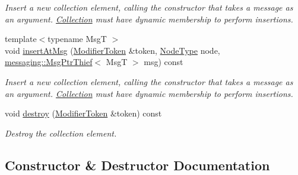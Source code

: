\begin{DoxyCompactItemize}
\begin{DoxyCompactList}\small\item\em Insert a new collection element, calling the constructor that takes a message as an argument. \hyperlink{structvt_1_1vrt_1_1collection_1_1_collection}{Collection} must have dynamic membership to perform insertions. \end{DoxyCompactList}\item 
{\footnotesize template$<$typename MsgT $>$ }\\void \hyperlink{structvt_1_1vrt_1_1collection_1_1_elm_insertable_ad07c3ba53ef279936ec6a2e4d06b3ea3}{insert\+At\+Msg} (\hyperlink{structvt_1_1vrt_1_1collection_1_1_modifier_token}{Modifier\+Token} \&token, \hyperlink{namespacevt_a866da9d0efc19c0a1ce79e9e492f47e2}{Node\+Type} node, \hyperlink{structvt_1_1messaging_1_1_msg_ptr_thief}{messaging\+::\+Msg\+Ptr\+Thief}$<$ MsgT $>$ msg) const
\begin{DoxyCompactList}\small\item\em Insert a new collection element, calling the constructor that takes a message as an argument. \hyperlink{structvt_1_1vrt_1_1collection_1_1_collection}{Collection} must have dynamic membership to perform insertions. \end{DoxyCompactList}\item 
void \hyperlink{structvt_1_1vrt_1_1collection_1_1_elm_insertable_a0ba9cf2ab8ea1f06571b8c984286dff1}{destroy} (\hyperlink{structvt_1_1vrt_1_1collection_1_1_modifier_token}{Modifier\+Token} \&token) const
\begin{DoxyCompactList}\small\item\em Destroy the collection element. \end{DoxyCompactList}\end{DoxyCompactItemize}


\subsection{Constructor \& Destructor Documentation}
\mbox{\label{structvt_1_1vrt_1_1collection_1_1_elm_insertable_a0a5528f369218ac386c4ab521bebffdd}} 
